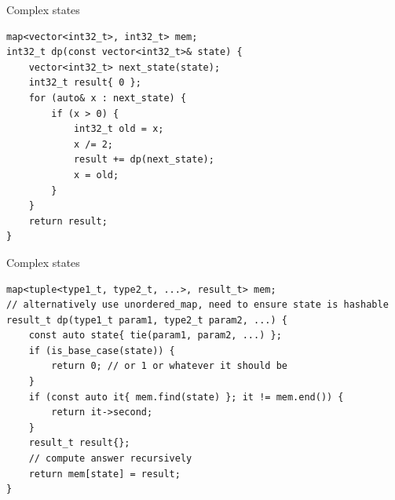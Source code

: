 \documentclass{beamer}
\begin{document}
\begin{frame}{Complex states}
    \begin{verbatim}
map<vector<int32_t>, int32_t> mem;
int32_t dp(const vector<int32_t>& state) {
    vector<int32_t> next_state(state);
    int32_t result{ 0 };
    for (auto& x : next_state) {
        if (x > 0) {
            int32_t old = x;
            x /= 2;
            result += dp(next_state);
            x = old;
        }
    }
    return result;
}
    \end{verbatim}
\end{frame}

\begin{frame}{Complex states}
    \begin{verbatim}
map<tuple<type1_t, type2_t, ...>, result_t> mem;
// alternatively use unordered_map, need to ensure state is hashable
result_t dp(type1_t param1, type2_t param2, ...) {
    const auto state{ tie(param1, param2, ...) };
    if (is_base_case(state)) {
        return 0; // or 1 or whatever it should be
    }
    if (const auto it{ mem.find(state) }; it != mem.end()) {
        return it->second;
    }
    result_t result{};
    // compute answer recursively
    return mem[state] = result;
}
    \end{verbatim}
\end{frame}
\end{document}

